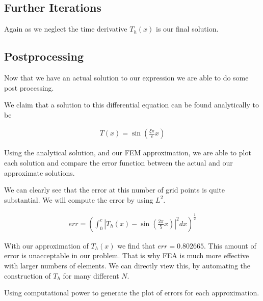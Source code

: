 \documentclass[10pt]{amsart}
\numberwithin{equation}{section}
\newenvironment{Figure}
{\par\medskip\noindent\minipage{\linewidth}}
{\endminipage\par\medskip}
\theoremstyle{definition}
\begin{document}
\begin{multicols}{2}
\subsection{Further Iterations}%
\label{sub:further_iterations}

Again as we neglect the time derivative $T_h(x)$ is our final solution.

\subsection{Postprocessing}%
\label{sub:postprocessing}

Now that we have an actual solution to our expression we are able to do some
post processing.

We claim that a solution to this differential equation can be found analytically
to be

\begin{align*}
  T(x) = \sin\left(\frac{\xi\pi}{c}x\right)
\end{align*}

Using the analytical solution, and our FEM approximation, we are able to plot
each solution and compare the error function between the actual and our
approximate solutions.

\begin{Figure}
   \begin{center}
     
   \end{center}
\end{Figure}

We can clearly see that the error at this number of grid points is quite
substantial. We will compute the error by using $L^2$.

\begin{align*}
  err = {\left(\int_0^c{\left|T_h(x)-\sin\left(\frac{2\pi}{5}x\right)\right|}^2dx\right)}^{\frac{1}{2}}
\end{align*}

With our approximation of $T_h(x)$ we find that $err=0.802665$. This amount of
error is unacceptable in our problem. That is why FEA is much more effective
with larger numbers of elements. We can directly view this, by automating the
construction of $T_h$ for many different $N$.

Using computational power to generate the plot of errors for each
approximation.

\begin{Figure}
   \begin{center}
     
   \end{center}
\end{Figure}


\end{multicols}
\end{document}
